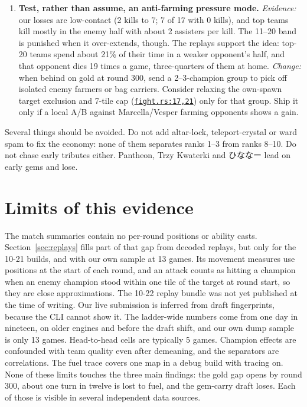 \documentclass[11pt,a4paper]{article}
\newcommand{\repo}{file:///Users/tristanbasri/Desktop/Code/cambridge-battlecode-s2}
\newcommand{\code}[2]{\href{\repo/#1}{\texttt{\textcolor{cOurs!80!black}{#2}}}}
\newcommand{\vfive}{bots/bot-v5-r175199/src}
\begin{document}
\begin{enumerate}[leftmargin=1.4em, itemsep=0.45em]
\item \textbf{Test, rather than assume, an anti-farming pressure mode.} \emph{Evidence:} our losses are low-contact (2 kills to 7; 7 of 17 with 0 kills), and top teams kill mostly in the enemy half with about 2 assisters per kill. The 11--20 band is punished when it over-extends, though. The replays support the idea: top-20 teams spend about 21\% of their time in a weaker opponent's half, and that opponent dies 19 times a game, three-quarters of them at home. \emph{Change:} when behind on gold at round 300, send a 2--3-champion group to pick off isolated enemy farmers or bag carriers. Consider relaxing the own-spawn target exclusion and 7-tile cap (\code{\vfive/common/fight.rs}{fight.rs:17,21}) only for that group. Ship it only if a local A/B against Marcella/Vesper farming opponents shows a gain.
\end{enumerate}

Several things should be avoided. Do not add altar-lock, teleport-crystal or ward spam to fix the economy: none of them separates ranks 1--3 from ranks 8--10. Do not chase early tributes either. Pantheon, Trzy Kwaterki and {\jp ひななー} lead on early gems and lose.

\section{Limits of this evidence}

The match summaries contain no per-round positions or ability casts. Section~\ref{sec:replays} fills part of that gap from decoded replays, but only for the 10-21 builds, and with our own sample at 13 games. Its movement measures use positions at the start of each round, and an attack counts as hitting a champion when an enemy champion stood within one tile of the target at round start, so they are close approximations. The 10-22 replay bundle was not yet published at the time of writing. Our live submission is inferred from draft fingerprints, because the CLI cannot show it. The ladder-wide numbers come from one day in nineteen, on older engines and before the draft shift, and our own dump sample is only 13 games. Head-to-head cells are typically 5 games. Champion effects are confounded with team quality even after demeaning, and the separators are correlations. The fuel trace covers one map in a debug build with tracing on. None of these limits touches the three main findings: the gold gap opens by round 300, about one turn in twelve is lost to fuel, and the gem-carry draft loses. Each of those is visible in several independent data sources.
\end{document}
